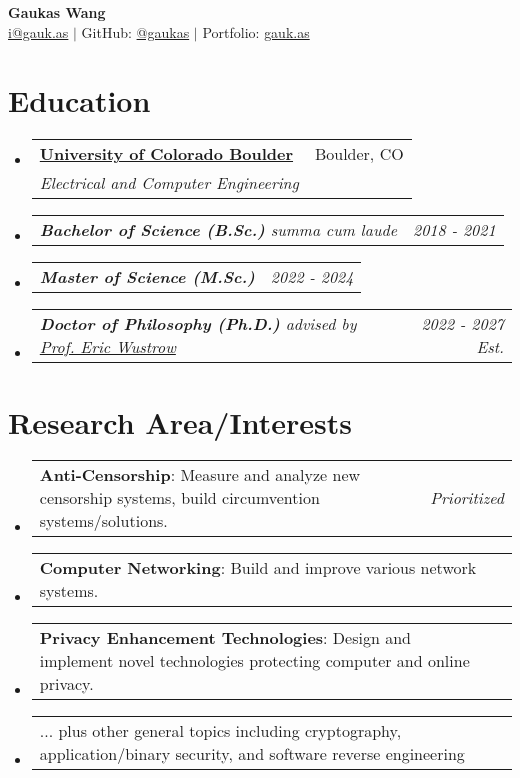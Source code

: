 \documentclass[letterpaper,11pt]{article}
\makeatletter
\newcommand{\resumeSubheading}[4]{
  \vspace{-2pt}\item
    \begin{tabular*}{0.97\textwidth}[t]{l@{\extracolsep{\fill}}r}
      \textbf{#1} & #2 \\
      \textit{\small#3} & \textit{\small #4} \\
    \end{tabular*}\vspace{-7pt}
}
\newcommand{\resumeSubSubheading}[2]{
    \item
    \begin{tabular*}{0.97\textwidth}{l@{\extracolsep{\fill}}r}
      \textit{\small#1} & \textit{\small #2} \\
    \end{tabular*}\vspace{-7pt}
}
\newcommand{\resumeProjectHeading}[2]{
    \item
    \begin{tabular*}{0.97\textwidth}{l@{\extracolsep{\fill}}r}
      \small#1 & #2 \\
    \end{tabular*}\vspace{-7pt}
}
\newcommand{\resumeSubHeadingListStart}{\begin{itemize}[leftmargin=0.15in, label={}]}
\newcommand{\resumeSubHeadingListEnd}{\end{itemize}}
\makeatother
\begin{document}
\begin{center}
  {\textbf{\Huge Gaukas Wang}} \\ \vspace{4pt}
    \href{mailto:i@gauk.as}{{i@gauk.as}} $|$ 
    GitHub: \href{https://github.com/gaukas}{@gaukas} $|$ 
    Portfolio: \href{https://gauk.as}{gauk.as}
\end{center}


\section{Education}
\resumeSubHeadingListStart
\resumeSubheading
{\href{https://colorado.edu}{University of Colorado Boulder}}{Boulder, CO}
{Electrical and Computer Engineering}{}
\resumeSubSubheading
{
  \em{\textbf{Bachelor of Science (B.Sc.)}} \textit{summa cum laude}
}{2018 - 2021}
\resumeSubSubheading
{
  \em{}\textbf{Master of Science (M.Sc.)} %
}{2022 - 2024}
\resumeSubSubheading
{
  \em{}\textbf{Doctor of Philosophy (Ph.D.)} 
  {advised by \href{https://ericw.us/trow}{Prof. Eric Wustrow}}
}{2022 - 2027 Est.}
\resumeSubHeadingListEnd

\vspace{1pt}

\section{Research Area/Interests}
\resumeSubHeadingListStart
  \resumeProjectHeading {\textbf{Anti-Censorship}: Measure and analyze new censorship systems, build circumvention systems/solutions.}{\textit{Prioritized}}
  \resumeProjectHeading {\textbf{Computer Networking}: Build and improve various network systems.}{}
  \resumeProjectHeading {\textbf{Privacy Enhancement Technologies}: Design and implement novel technologies protecting computer and online privacy.}{}
  \resumeProjectHeading {... plus other general topics including cryptography, application/binary security, and software reverse engineering}{}
\resumeSubHeadingListEnd
\vspace{1pt}

\end{document}
